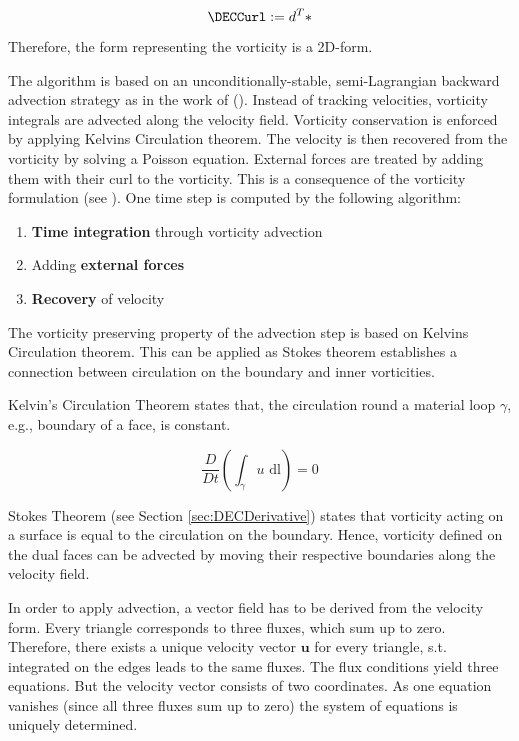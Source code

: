 \begin{equation}
\label{eq:DefCurl}
\DECCurl := d^T *
\end{equation}

Therefore, the form representing the vorticity is a 2D-form.

\label{sec:SimpleAlgorithm}

The algorithm is based on an unconditionally-stable, semi-Lagrangian backward advection strategy as in the work of ().
Instead of tracking velocities, vorticity integrals are advected along the velocity field.
Vorticity conservation is enforced by applying Kelvins Circulation theorem. 
The velocity is then recovered from the vorticity by solving a Poisson equation.
External forces are treated by adding them with their curl to the vorticity.
This is a consequence of the vorticity formulation (see ).
One time step is computed by the following algorithm:

\begin{enumerate}
\item \textbf{Time integration} through vorticity advection
\item Adding \textbf{external forces}
\item \textbf{Recovery} of velocity
\end{enumerate}

\label{ssec:TimeIntegration}
The vorticity preserving property of the advection step is based on Kelvins Circulation theorem. 
This can be applied as Stokes theorem establishes a connection between circulation on the boundary and inner vorticities.

Kelvin's Circulation Theorem states that, the circulation round a material loop $\gamma$, e.g., boundary of a face, is constant.

\begin{equation}
\frac{D}{Dt} ( \int_\gamma u \text{ dl} ) = 0
\end{equation}

Stokes Theorem (see Section \ref{sec:DECDerivative}) states that vorticity acting on a surface is equal to the circulation on the boundary.
Hence, vorticity defined on the dual faces can be advected by moving their respective boundaries along the velocity field.

In order to apply advection, a vector field has to be derived from the velocity form.
Every triangle corresponds to three fluxes, which sum up to zero.
Therefore, there exists a unique velocity vector $\mathbf{u}$ for every triangle, s.t. integrated on the edges leads to the same fluxes.
The flux conditions yield three equations.
But the velocity vector consists of two coordinates.
As one equation vanishes (since all three fluxes sum up to zero) the system of equations is uniquely determined.

